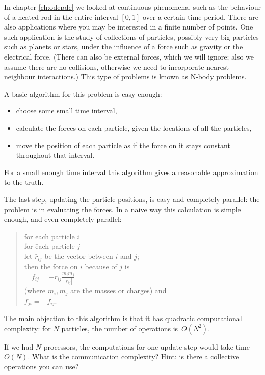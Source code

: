 In chapter \ref{ch:odepde} we looked at continuous phenomena, such as
the behaviour of a heated rod in the entire interval $[0,1]$ over a
certain time period. There are also applications where you may be
interested in a finite number of points. One such application is the
study of collections of particles, possibly very big particles such as
planets or stars, under the influence of a force such as gravity or
the electrical force. (There can also be external forces, which we
will ignore; also we assume there are no collisions, otherwise we need to incorporate nearest-neighbour interactions.) This type of
problems is known as N-body problems.

A basic algorithm for this problem is easy enough:
\begin{itemize}
\item choose some small time interval,
\item calculate the forces on each particle, given the locations of
  all the particles,
\item move the position of each particle as if the force on it stays
  constant throughout that interval.
\end{itemize}
For a small enough time interval this algorithm gives a reasonable approximation to the truth. 

The last step, updating the particle positions, is easy and completely
parallel: the problem is in evaluating the forces. In a naive way this
calculation is simple enough, and even completely parallel:
\begin{quotation}
  \begin{tabbing}
    for \=each particle $i$\\
    \>for \= each particle $j$\\
    \>\> let $\bar r_{ij}$ be the vector between $i$ and $j$;\\
    \>\> then the force on $i$ because of $j$ is\\
    \>\> $\quad f_{ij} = -\bar r_{ij}\frac{m_im_j}{|r_{ij}|}$\\
    \>\> (where $m_i,m_j$ are the masses or charges) and\\
    \>\> $f_{ji}=-f_{ij}$.
  \end{tabbing}
\end{quotation}
The main objection to this algorithm is that it has quadratic computational
complexity: for $N$ particles, the number of operations is~$O(N^2)$.

\begin{exercise}
  If we had $N$ processors, the computations for one update step would
  take time~$O(N)$.  What is the communication complexity? Hint: is
  there a collective operations you can use?
\end{exercise}

